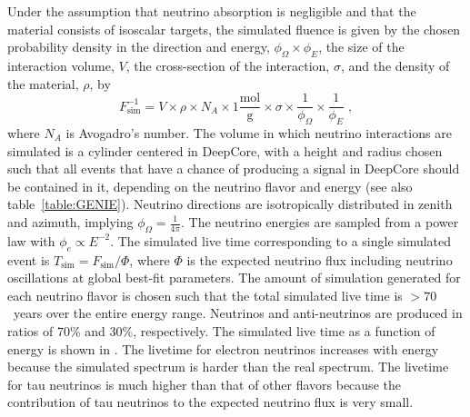 Under the assumption that neutrino absorption is negligible and that the material consists of isoscalar targets, the simulated fluence is given by the chosen probability density in the direction and energy, $\phi_\Omega \times \phi_E$,  the size of the interaction volume, $V$, the cross-section of the interaction, $\sigma$, and the density of the material, $\rho$, by
\begin{equation}
    F_{\mathrm{sim}}^{-1} = V \times \rho \times N_A \times 1\frac{\mathrm{mol}}{\mathrm{g}} \times \sigma \times \frac{1}{\phi_\Omega} \times \frac{1}{\phi_E}\;,
\end{equation}
where $N_A$ is Avogadro's number. The volume in which neutrino interactions are simulated is a cylinder centered in DeepCore, with a height and radius chosen such that all events that have a chance of producing a signal in DeepCore should be contained in it, depending on the neutrino flavor and energy (see also table~\ref{table:GENIE}). Neutrino directions are isotropically distributed in zenith and azimuth, implying $\phi_\Omega = \frac{1}{4\pi}$. The neutrino energies are sampled from a power law with $\phi_e \propto E^{-2}$. The simulated live time corresponding to a single simulated event is  $T_{\mathrm{sim}} =  F_{\mathrm{sim}} / \Phi$, where $\Phi$ is the expected neutrino flux including neutrino oscillations at global best-fit parameters.
The amount of simulation generated for each neutrino flavor is chosen such that the total simulated live time is $>70$~years over the entire energy range.
Neutrinos and anti-neutrinos are produced in ratios of 70\% and 30\%, respectively.
The simulated live time as a function of energy is shown in .
The livetime for electron neutrinos increases with energy because the simulated spectrum is harder than the real spectrum.
The livetime for tau neutrinos is much higher than that of other flavors because the contribution of tau neutrinos to the expected neutrino flux is very small.

